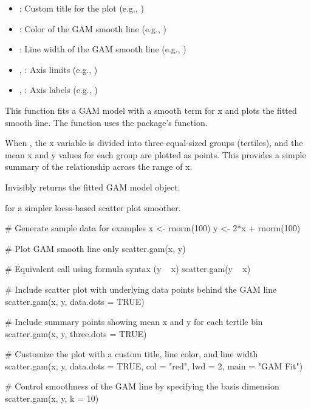 \documentclass[a4paper]{book}
\begin{document}
\begin{Arguments}
\begin{ldescription}
\begin{itemize}
\item{} : Custom title for the plot (e.g., )
\item{} : Color of the GAM smooth line (e.g., )
\item{} : Line width of the GAM smooth line (e.g., )
\item{} , : Axis limits (e.g., )
\item{} , : Axis labels (e.g., )

\end{itemize}

\end{ldescription}
\end{Arguments}
%
\begin{Details}
This function fits a GAM model with a smooth term for x and plots the fitted
smooth line. The function uses the  package's  function.

When , the x variable is divided into three equal-sized
groups (tertiles), and the mean x and y values for each group are plotted as
points. This provides a simple summary of the relationship across the range of x.
\end{Details}
%
\begin{Value}
Invisibly returns the fitted GAM model object.
\end{Value}
%
\begin{SeeAlso}
 for a simpler loess-based scatter plot smoother.
\end{SeeAlso}
%
\begin{Examples}
\begin{ExampleCode}
# Generate sample data for examples
x <- rnorm(100)
y <- 2*x + rnorm(100)

# Plot GAM smooth line only
scatter.gam(x, y)

# Equivalent call using formula syntax (y ~ x)
scatter.gam(y ~ x)

# Include scatter plot with underlying data points behind the GAM line
scatter.gam(x, y, data.dots = TRUE)

# Include summary points showing mean x and y for each tertile bin
scatter.gam(x, y, three.dots = TRUE)

# Customize the plot with a custom title, line color, and line width
scatter.gam(x, y, data.dots = TRUE, col = "red", lwd = 2, main = "GAM Fit")

# Control smoothness of the GAM line by specifying the basis dimension
scatter.gam(x, y, k = 10)

\end{ExampleCode}
\end{Examples}
\end{document}
